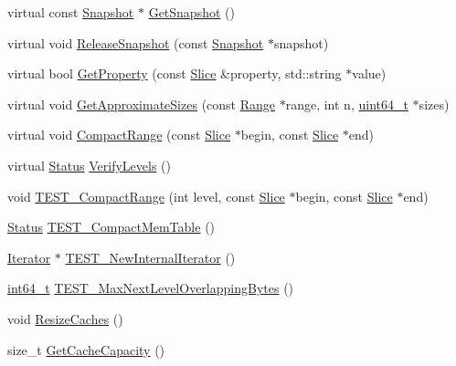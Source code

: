 \begin{DoxyCompactItemize}
\item 
virtual const \hyperlink{classleveldb_1_1_snapshot}{Snapshot} $\ast$ \hyperlink{classleveldb_1_1_d_b_impl_a4bec3d8ffd65fec562b2dd1f6eaba137}{Get\+Snapshot} ()
\item 
virtual void \hyperlink{classleveldb_1_1_d_b_impl_a6c0b6abfc9a30cc8e5412d4fc3e8c886}{Release\+Snapshot} (const \hyperlink{classleveldb_1_1_snapshot}{Snapshot} $\ast$snapshot)
\item 
virtual bool \hyperlink{classleveldb_1_1_d_b_impl_ad1a2023ce171c8f8476664f5b1cbab4d}{Get\+Property} (const \hyperlink{classleveldb_1_1_slice}{Slice} \&property, std\+::string $\ast$value)
\item 
virtual void \hyperlink{classleveldb_1_1_d_b_impl_af08e218d92064699942c195ce0f06010}{Get\+Approximate\+Sizes} (const \hyperlink{structleveldb_1_1_range}{Range} $\ast$range, int n, \hyperlink{stdint_8h_aaa5d1cd013383c889537491c3cfd9aad}{uint64\+\_\+t} $\ast$sizes)
\item 
virtual void \hyperlink{classleveldb_1_1_d_b_impl_aa6df0739fc0b49380c284347e411b8ed}{Compact\+Range} (const \hyperlink{classleveldb_1_1_slice}{Slice} $\ast$begin, const \hyperlink{classleveldb_1_1_slice}{Slice} $\ast$end)
\item 
virtual \hyperlink{classleveldb_1_1_status}{Status} \hyperlink{classleveldb_1_1_d_b_impl_abde8252536a8f48c36d1dc9a9738a508}{Verify\+Levels} ()
\item 
void \hyperlink{classleveldb_1_1_d_b_impl_a63fcb49466b689a534ba77d32cf84f99}{T\+E\+S\+T\+\_\+\+Compact\+Range} (int level, const \hyperlink{classleveldb_1_1_slice}{Slice} $\ast$begin, const \hyperlink{classleveldb_1_1_slice}{Slice} $\ast$end)
\item 
\hyperlink{classleveldb_1_1_status}{Status} \hyperlink{classleveldb_1_1_d_b_impl_a8642703fd1398cd8e3f5f24ee0b9da23}{T\+E\+S\+T\+\_\+\+Compact\+Mem\+Table} ()
\item 
\hyperlink{classleveldb_1_1_iterator}{Iterator} $\ast$ \hyperlink{classleveldb_1_1_d_b_impl_adba5bf4252bd94f7db50e62921b7ba53}{T\+E\+S\+T\+\_\+\+New\+Internal\+Iterator} ()
\item 
\hyperlink{stdint_8h_adec1df1b8b51cb32b77e5b86fff46471}{int64\+\_\+t} \hyperlink{classleveldb_1_1_d_b_impl_af621636048b8d3cfaa21238fe26ef0ca}{T\+E\+S\+T\+\_\+\+Max\+Next\+Level\+Overlapping\+Bytes} ()
\item 
void \hyperlink{classleveldb_1_1_d_b_impl_a8c55d841907600de2c6fd42dd610aeef}{Resize\+Caches} ()
\item 
size\+\_\+t \hyperlink{classleveldb_1_1_d_b_impl_a271b1e263334742c7ff3cb4093eb9735}{Get\+Cache\+Capacity} ()

\end{DoxyCompactItemize}
